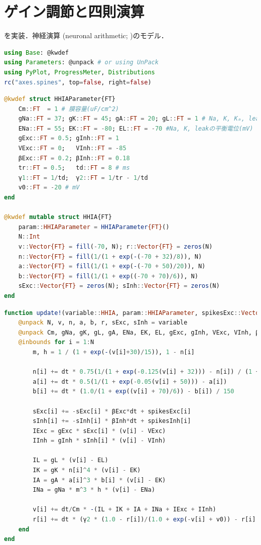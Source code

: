 \section{ゲイン調節と四則演算}
\citep{Goldwyn2018-ug}を実装．神経演算 (neuronal arithmetic; \citep{Angus_Silver2010-fd})のモデル．
\begin{lstlisting}[language=julia]
using Base: @kwdef
using Parameters: @unpack # or using UnPack
using PyPlot, ProgressMeter, Distributions
rc("axes.spines", top=false, right=false)
\end{lstlisting}
\begin{lstlisting}[language=julia]
@kwdef struct HHIAParameter{FT}
    Cm::FT  = 1 # 膜容量(uF/cm^2)
    gNa::FT = 37; gK::FT = 45; gA::FT = 20; gL::FT = 1 # Na, K, Kₐ, leakの最大コンダクタンス(mS/cm^2)
    ENa::FT = 55; EK::FT = -80; EL::FT = -70 #Na, K, leakの平衡電位(mV)
    gExc::FT = 0.5; gInh::FT = 1
    VExc::FT = 0;   VInh::FT = -85
    βExc::FT = 0.2; βInh::FT = 0.18
    tr::FT = 0.5;   td::FT = 8 # ms
    γ1::FT = 1/td;  γ2::FT = 1/tr - 1/td
    v0::FT = -20 # mV
end

@kwdef mutable struct HHIA{FT}
    param::HHIAParameter = HHIAParameter{FT}()
    N::Int
    v::Vector{FT} = fill(-70, N); r::Vector{FT} = zeros(N)
    n::Vector{FT} = fill(1/(1 + exp(-(-70 + 32)/8)), N)
    a::Vector{FT} = fill(1/(1 + exp(-(-70 + 50)/20)), N)
    b::Vector{FT} = fill(1/(1 + exp((-70 + 70)/6)), N)
    sExc::Vector{FT} = zeros(N); sInh::Vector{FT} = zeros(N)
end
\end{lstlisting}
\begin{lstlisting}[language=julia]
function update!(variable::HHIA, param::HHIAParameter, spikesExc::Vector, spikesInh::Vector, dt)
    @unpack N, v, n, a, b, r, sExc, sInh = variable
    @unpack Cm, gNa, gK, gL, gA, ENa, EK, EL, gExc, gInh, VExc, VInh, βExc, βInh, γ1, γ2, v0 = param
    @inbounds for i = 1:N
        m, h = 1 / (1 + exp(-(v[i]+30)/15)), 1 - n[i]
        
        n[i] += dt * 0.75(1/(1 + exp(-0.125(v[i] + 32))) - n[i]) / (1 + 100 / (1 + exp((v[i] + 80)/26)))
        a[i] += dt * 0.5(1/(1 + exp(-0.05(v[i] + 50))) - a[i])
        b[i] += dt * (1.0/(1 + exp((v[i] + 70)/6)) - b[i]) / 150
        
        sExc[i] += -sExc[i] * βExc*dt + spikesExc[i]
        sInh[i] += -sInh[i] * βInh*dt + spikesInh[i]
        IExc = gExc * sExc[i] * (v[i] - VExc) 
        IInh = gInh * sInh[i] * (v[i] - VInh)

        IL = gL * (v[i] - EL)
        IK = gK * n[i]^4 * (v[i] - EK)
        IA = gA * a[i]^3 * b[i] * (v[i] - EK)
        INa = gNa * m^3 * h * (v[i] - ENa)
        
        v[i] += dt/Cm * -(IL + IK + IA + INa + IExc + IInh)
        r[i] += dt * (γ2 * (1.0 - r[i])/(1.0 + exp(-v[i] + v0)) - r[i] * γ1)
    end
end
\end{lstlisting}
